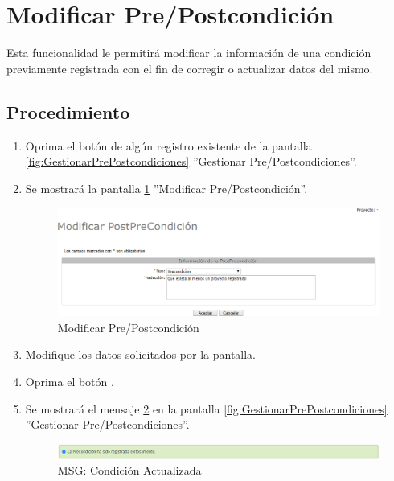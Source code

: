 \hypertarget{cv:modificarCondicion}{\section{Modificar Pre/Postcondición}} \label{sec:modificarCondicion}

	Esta funcionalidad le permitirá modificar la información de una condición previamente registrada con el fin de corregir o actualizar datos del mismo. 

		\subsection{Procedimiento}

			\begin{enumerate}
	
			\item Oprima el botón \IUEditar{} de algún registro existente de la pantalla \ref{fig:GestionarPrePostcondiciones} ''Gestionar Pre/Postcondiciones''.
	
			\item Se mostrará la pantalla \ref{fig:modificarPrePostcondicion} ''Modificar Pre/Postcondición''.
			
			\begin{figure}[htbp!]
				\begin{center}
					\includegraphics[scale=0.6]{roles/lider/casosUso/precondiciones/pantallas/IU6-1-2-2modificarCondicion}
					\caption{Modificar Pre/Postcondición}
					\label{fig:modificarPrePostcondicion}
				\end{center}
			\end{figure}
		
			\item Modifique los datos solicitados por la pantalla.
						
			\item Oprima el botón \IUAceptar.
			
			\item Se mostrará el mensaje \ref{fig:PrePostModificada} en la pantalla \ref{fig:GestionarPrePostcondiciones} ''Gestionar Pre/Postcondiciones''.
			
			\begin{figure}[htbp!]
				\begin{center}
					\includegraphics[scale=0.6]{roles/lider/casosUso/precondiciones/pantallas/IU6-1-2-1MSG1}
					\caption{MSG: Condición Actualizada}
					\label{fig:PrePostModificada}
				\end{center}
			\end{figure}
			\end{enumerate}
